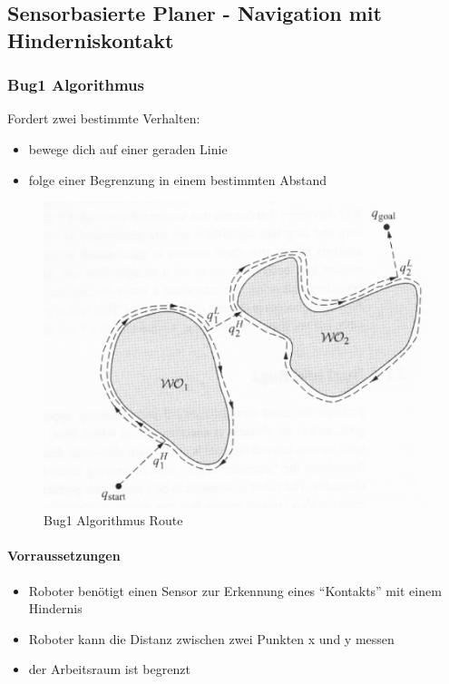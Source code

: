 \subsection{Sensorbasierte Planer - Navigation mit Hinderniskontakt}
\subsubsection{Bug1 Algorithmus}
Fordert zwei bestimmte Verhalten:
\begin{itemize}
	\item bewege dich auf einer geraden Linie
	\item folge einer Begrenzung in einem bestimmten Abstand
\end{itemize}
\begin{figure}[H]
	\begin{center}
		\includegraphics[scale=0.5]{Resources/PNG/Bug1.png}
		\caption{Bug1 Algorithmus Route}
		\label{fig:PNG/Bug1.png}
	\end{center}
\end{figure}
\paragraph{Vorraussetzungen}
\begin{itemize}
	\item Roboter benötigt einen Sensor zur Erkennung eines \enquote{Kontakts} mit einem Hindernis
	\item Roboter kann die Distanz zwischen zwei Punkten x und y messen
	\item der Arbeitsraum ist begrenzt
\end{itemize}
